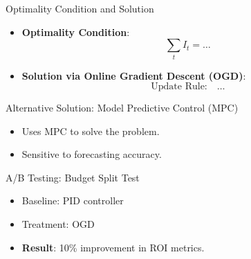 \documentclass{beamer}
\begin{document}
	\begin{frame}{Optimality Condition and Solution}
		\begin{itemize}
			\item \textbf{Optimality Condition}:
			\[
			\sum_t I_t = \ldots
			\]
			\item \textbf{Solution via Online Gradient Descent (OGD)}:
			\[
			\text{Update Rule:} \quad \ldots
			\]
		\end{itemize}
	\end{frame}
	
	\begin{frame}{Alternative Solution: Model Predictive Control (MPC)}
		\begin{itemize}
			\item Uses MPC to solve the problem.
			\item Sensitive to forecasting accuracy.
		\end{itemize}
	\end{frame}
	
	\begin{frame}{A/B Testing: Budget Split Test}
		\begin{itemize}
			\item Baseline: PID controller
			\item Treatment: OGD
			\item \textbf{Result}: 10\% improvement in ROI metrics.
		\end{itemize}
	\end{frame}
	
\end{document}
